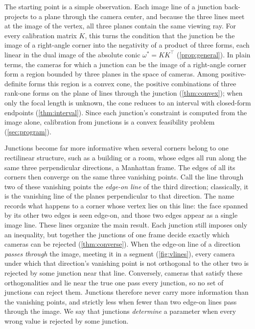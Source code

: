 \documentclass[pdflatex,sn-mathphys-num,iicol]{sn-jnl}
\theoremstyle{thmstyleone}
\theoremstyle{thmstylethree}
\theoremstyle{thmstyletwo}
\begin{document}
The starting point is a simple observation. Each image line of a junction back-projects to a plane through the camera center, and because the three lines meet at the image of the vertex, all three planes contain the same viewing ray. For every calibration matrix $K$, this turns the condition that the junction be the image of a right-angle corner into the negativity of a product of three forms, each linear in the dual image of the absolute conic $\omega^{*}=KK^{\top}$ (\cref{prop:general}). In plain terms, the cameras for which a junction can be the image of a right-angle corner form a region bounded by three planes in the space of cameras. Among positive-definite forms this region is a convex cone, the positive combinations of three rank-one forms on the plane of lines through the junction (\cref{thm:convex}); when only the focal length is unknown, the cone reduces to an interval with closed-form endpoints (\cref{thm:interval}). Since each junction's constraint is computed from the image alone, calibration from junctions is a convex feasibility problem (\cref{sec:program}).

Junctions become far more informative when several corners belong to one rectilinear structure, such as a building or a room, whose edges all run along the same three perpendicular directions, a Manhattan frame. The edges of all its corners then converge on the same three vanishing points. Call the line through two of these vanishing points the \emph{edge-on line} of the third direction; classically, it is the vanishing line of the planes perpendicular to that direction. The name records what happens to a corner whose vertex lies on this line: the face spanned by its other two edges is seen edge-on, and those two edges appear as a single image line. These lines organize the main result.
Each junction still imposes only an inequality, but together the junctions of one frame decide exactly which cameras can be rejected (\cref{thm:converse}). When the edge-on line of a direction \emph{passes through} the image, meeting it in a segment (\cref{fig:vlines}), every camera under which that direction's vanishing point is not orthogonal to the other two is rejected by some junction near that line. Conversely, cameras that satisfy these orthogonalities and lie near the true one pass every junction, so no set of junctions can reject them. Junctions therefore never carry more information than the vanishing points, and strictly less when fewer than two edge-on lines pass through the image. We say that junctions \emph{determine} a parameter when every wrong value is rejected by some junction.
\end{document}
